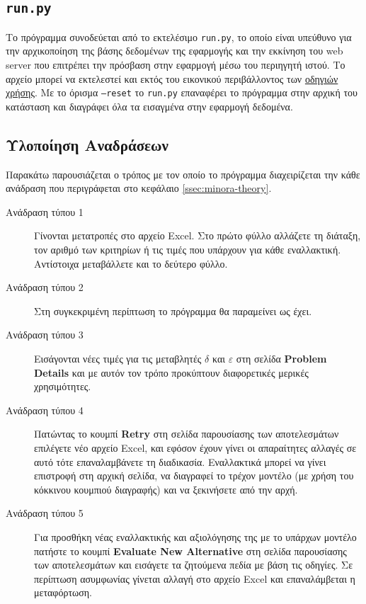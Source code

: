 \documentclass[11pt,a4paper,titlepage]{article}
\numberwithin{equation}{section}
\begin{document}
\subsection{\texttt{run.py}}
Το πρόγραμμα συνοδεύεται από το εκτελέσιμο \texttt{run.py}, το οποίο είναι υπεύθυνο για την αρχικοποίηση της βάσης δεδομένων της εφαρμογής και την εκκίνηση του web server που επιτρέπει την πρόσβαση στην εφαρμογή μέσω του περιηγητή ιστού. Το αρχείο μπορεί να εκτελεστεί και εκτός του εικονικού περιβάλλοντος των \hyperref[sec:instructions]{οδηγιών χρήσης}. Με το όρισμα \texttt{--reset} το \texttt{run.py} επαναφέρει το πρόγραμμα στην αρχική του κατάσταση και διαγράφει όλα τα εισαγμένα στην εφαρμογή δεδομένα.

\subsection{Υλοποίηση Αναδράσεων}
Παρακάτω παρουσιάζεται ο τρόπος με τον οποίο το πρόγραμμα διαχειρίζεται την κάθε ανάδραση που περιγράφεται στο κεφάλαιο \ref{ssec:minora-theory}.

\begin{description}
	\item[Ανάδραση τύπου 1]
	Γίνονται μετατροπές στο αρχείο Excel. Στο πρώτο φύλλο αλλάζετε τη διάταξη, τον αριθμό των κριτηρίων ή τις τιμές που υπάρχουν για κάθε εναλλακτική. Αντίστοιχα μεταβάλλετε και το δεύτερο φύλλο. 
	\item[Ανάδραση τύπου 2]
	Στη συγκεκριμένη περίπτωση το πρόγραμμα θα παραμείνει ως έχει.
	\item[Ανάδραση τύπου 3]
	Εισάγονται νέες τιμές για τις μεταβλητές $δ$ και $ε$ στη σελίδα \textbf{Problem Details} και με αυτόν τον τρόπο προκύπτουν διαφορετικές μερικές χρησιμότητες.
	\item[Ανάδραση τύπου 4]
	Πατώντας το κουμπί \textbf{Retry} στη σελίδα παρουσίασης των αποτελεσμάτων επιλέγετε νέο αρχείο Excel, και εφόσον έχουν γίνει οι απαραίτητες αλλαγές σε αυτό τότε επαναλαμβάνετε τη διαδικασία. Εναλλακτικά μπορεί να γίνει επιστροφή στη αρχική σελίδα, να διαγραφεί το τρέχον μοντέλο (με χρήση του κόκκινου κουμπιού διαγραφής) και να ξεκινήσετε από την αρχή.
	\item[Ανάδραση τύπου 5]
	Για προσθήκη νέας εναλλακτικής και αξιολόγησης της με το υπάρχων μοντέλο πατήστε το κουμπί \textbf{Evaluate New Alternative} στη σελίδα παρουσίασης των αποτελεσμάτων και εισάγετε τα ζητούμενα πεδία με βάση τις οδηγίες. Σε περίπτωση ασυμφωνίας γίνεται αλλαγή στο αρχείο Excel και επαναλάμβεται η μεταφόρτωση.
\end{description}
\end{document}

